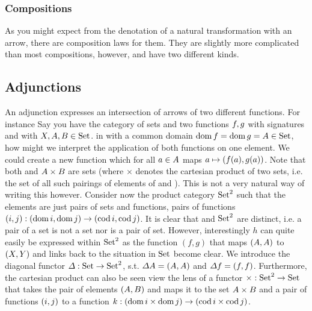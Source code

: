 \subsubsection{Compositions}
As you might expect from the denotation of a natural transformation with an
arrow, there are composition laws for them. They are slightly more complicated
than most compositions, however, and have two different kinds.
\theoremstyle{definition}\newtheorem*{verticalcompositiondef}{Vertical Composition}
\theoremstyle{definition}\newtheorem*{horizontalcompositiondef}{Horizontal Composition}


\verticalcomposition{\tau}{\nu}


\subsection{Adjunctions}
An adjunction expresses an intersection of arrows of two different functions. For instance Say you have the category  of sets \cite{RelationalAlgebraByWayOfAdjunctions} and two functions $\mathnormal{f}, \mathnormal{g}$ with signatures  and  with $\mathnormal{X}, \mathnormal{A}, \mathnormal{B} \in \mathrm{Set}$.
in  with a common domain $\mathrm{dom}\,\mathnormal{f} = \mathrm{dom}\,\mathnormal{g} = \mathnormal{A} \in \mathrm{Set}$, how might we interpret the application of both functions on one element. We could create a new function  which for all $a \in \mathnormal{A}$ maps $a \mapsto (\mathnormal{f}(a), \mathnormal{g}(a))$. Note that both  and $\mathnormal{A} \times \mathnormal{B}$ are sets (where $\times$ denotes the cartesian product of two sets, i.e. the set of all such pairings of elements of  and ). This is not a very natural way of writing this however. Consider now the product category $\mathrm{Set}^2$ such that the elements are just pairs of sets and functions, pairs of functions $(\mathnormal{i}, \mathnormal{j}): (\mathrm{dom}\,\mathnormal{i}, \mathrm{dom}\,\mathnormal{j}) \to (\mathrm{cod}\,\mathnormal{i}, \mathrm{cod}\,\mathnormal{j})$. It is clear that  and $\mathrm{Set}^2$ are distinct, i.e. a pair of a set is not a set nor is a pair of set. However, interestingly $h$ can quite easily be expressed within $\mathrm{Set}^2$ as the function $(f, g)$ that maps $(\mathnormal{A}, \mathnormal{A})$ to $(\mathnormal{X}, \mathnormal{Y})$ and links back to the situation in $\mathrm{Set}$ become clear. We introduce the diagonal functor $\mathnormal{\Delta}: \mathrm{Set} \to \mathrm{Set}^2$, s.t. $\mathnormal{\Delta} \mathnormal{A} = (\mathnormal{A}, \mathnormal{A})$ and $\mathnormal{\Delta} \mathnormal{f} = (\mathnormal{f}, \mathnormal{f})$. Furthermore, the cartesian product can also be seen view the lens of a functor $\mathnormal{\times}: \mathrm{Set}^2 \to \mathrm{Set}$ that takes the pair of elements $(\mathnormal{A}, \mathnormal{B})$ and maps it to the set $\mathnormal{A} \times \mathnormal{B}$ and a pair of functions $(\mathnormal{i}, \mathnormal{j})$ to a function $k: \left(\mathrm{dom}\,\mathnormal{i} \times \mathrm{dom}\,\mathnormal{j}\right) \to \left(\mathrm{cod}\,\mathnormal{i} \times \mathrm{cod}\,\mathnormal{j}\right)$.
